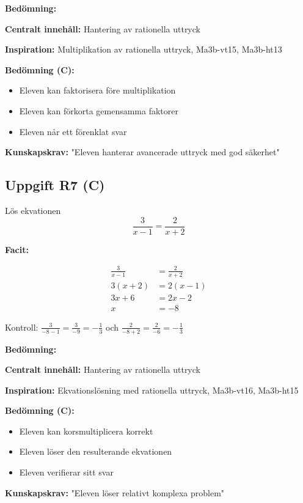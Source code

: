 \documentclass[12pt]{article}
\begin{document}
\begin{refbox}
\textbf{Bedömning:}

\textbf{Centralt innehåll:} Hantering av rationella uttryck

\textbf{Inspiration:} Multiplikation av rationella uttryck, Ma3b-vt15, Ma3b-ht13

\textbf{Bedömning (C):}
\begin{itemize}
    \item Eleven kan faktorisera före multiplikation
    \item Eleven kan förkorta gemensamma faktorer
    \item Eleven når ett förenklat svar
\end{itemize}

\textbf{Kunskapskrav:} "Eleven hanterar avancerade uttryck med god säkerhet"
\end{refbox}

\subsection*{Uppgift R7 (C)}
Lös ekvationen
\[
\frac{3}{x - 1} = \frac{2}{x + 2}
\]

\begin{facitbox}
\textbf{Facit:}

\begin{align*}
\frac{3}{x - 1} &= \frac{2}{x + 2} \\
3(x + 2) &= 2(x - 1) \\
3x + 6 &= 2x - 2 \\
x &= -8
\end{align*}

Kontroll: $\frac{3}{-8 - 1} = \frac{3}{-9} = -\frac{1}{3}$ och $\frac{2}{-8 + 2} = \frac{2}{-6} = -\frac{1}{3}$ \checkmark
\end{facitbox}

\begin{refbox}
\textbf{Bedömning:}

\textbf{Centralt innehåll:} Hantering av rationella uttryck

\textbf{Inspiration:} Ekvationslösning med rationella uttryck, Ma3b-vt16, Ma3b-ht15

\textbf{Bedömning (C):}
\begin{itemize}
    \item Eleven kan korsmultiplicera korrekt
    \item Eleven löser den resulterande ekvationen
    \item Eleven verifierar sitt svar
\end{itemize}

\textbf{Kunskapskrav:} "Eleven löser relativt komplexa problem"
\end{refbox}
\end{document}
